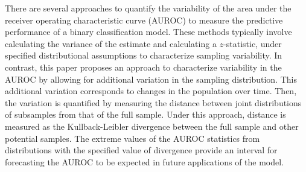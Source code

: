 There are several approaches to quantify the variability of the area under the receiver operating characteristic curve (AUROC) to measure the predictive performance of a binary classification model.
%
These methods typically involve calculating the variance of the estimate and calculating a $z$-statistic, under specified distributional assumptions
to characterize sampling variability.
%
%
In contrast, this paper proposes an approach
to characterize variability in the AUROC by allowing for additional variation in the sampling distribution.
%
This additional variation corresponds to changes in the population over time.
%
Then, the variation is quantified by measuring the distance between joint distributions of subsamples from that of the full sample.
% 
Under this approach, distance is measured as the Kullback-Leibler divergence between the full sample and other potential samples. 
%
The extreme values of the AUROC statistics from distributions with the specified value of divergence
provide an interval for forecasting the AUROC to be expected in future applications of the model.
%

%
%

